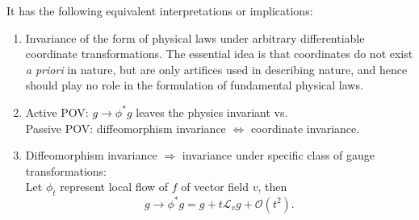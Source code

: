 It has the following equivalent interpretations or implications:\\
\begin{enumerate}
	\item Invariance of the form of physical laws under arbitrary differentiable coordinate transformations. The essential idea is that coordinates do not exist \emph{a priori} in nature, but are only artifices used in describing nature, and hence should play no role in the formulation of fundamental physical laws.
	\item Active POV: $g\rightarrow \phi^* g$ leaves the physics invariant vs. \\
	Passive POV: diffeomorphism invariance $\Leftrightarrow$ coordinate invariance.
	\item Diffeomorphism invariance $\Rightarrow$ invariance under specific class of gauge transformations:\\
	Let $\phi_t$ represent local flow of $f$ of vector field $v$, then
	\begin{equation}
	g \rightarrow \phi^* g = g + t \mathcal{L}_v g + \mathcal{O}(t^2).
	\end{equation}
\end{enumerate}


